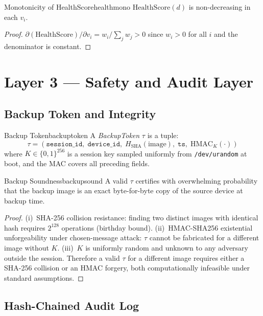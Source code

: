 \documentclass[11pt,a4paper]{report}
\begin{document}
\begin{proposition}{Monotonicity of HealthScore}{healthmono}
$\mathrm{HealthScore}(d)$ is non-decreasing in each $v_i$.
\end{proposition}

\begin{proof}
$\partial(\mathrm{HealthScore})/\partial v_i = w_i / \sum_j w_j > 0$ since $w_i > 0$ for all $i$ and the denominator is constant.
\end{proof}

\chapter{Layer 3 --- Safety and Audit Layer}

\section{Backup Token and Integrity}

\begin{definition}{Backup Token}{backuptoken}
A \emph{BackupToken} $\tau$ is a tuple:
\[
  \tau = (\mathtt{session\_id},\; \mathtt{device\_id},\; H_{\mathrm{SHA}}(\text{image}),\; \mathtt{ts},\; \mathrm{HMAC}_K(\cdot))
\]
where $K \in \{0,1\}^{256}$ is a session key sampled uniformly from \texttt{/dev/urandom} at boot, and the MAC covers all preceding fields.
\end{definition}

\begin{theorem}{Backup Soundness}{backupsound}
A valid $\tau$ certifies with overwhelming probability that the backup image is an exact byte-for-byte copy of the source device at backup time.
\end{theorem}

\begin{proof}
(i)~SHA-256 collision resistance: finding two distinct images with identical hash requires $2^{128}$ operations (birthday bound). (ii)~HMAC-SHA256 existential unforgeability under chosen-message attack: $\tau$ cannot be fabricated for a different image without $K$. (iii)~$K$ is uniformly random and unknown to any adversary outside the session. Therefore a valid $\tau$ for a different image requires either a SHA-256 collision or an HMAC forgery, both computationally infeasible under standard assumptions.
\end{proof}

\section{Hash-Chained Audit Log}
\label{sec:auditlog:def}
\end{document}
